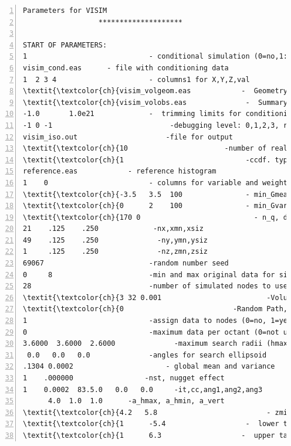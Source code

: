 \documentclass[12t]{article}
\begin{document}
\clearpage
\begin{table}
\scriptsize
\begin{Verbatim}[fontfamily=tt,numbers=left,commandchars=\\\{\}]
                  Parameters for VISIM
                  ********************

START OF PARAMETERS:
1                             - conditional simulation (0=no,1:(p,v), 2:(p), 3:(v)
visim_cond.eas      - file with conditioning data
1  2 3 4                      - columns1 for X,Y,Z,val
\textit{\textcolor{ch}{visim_volgeom.eas            -  Geometry of volume/ray}}
\textit{\textcolor{ch}{visim_volobs.eas              -  Summary of volgeom.eas.}}
-1.0       1.0e21             -  trimming limits for conditioning data
-1 0 -1                            -debugging level: 0,1,2,3, read\_covtab [1=from disk], read\_lambda
visim_iso.out                     -file for output
\textit{\textcolor{ch}{10                       -number of realizations to generate}}
\textit{\textcolor{ch}{1                             -ccdf. type: 0-Gaussian, 1-Dssim-histogram reproduction}}
reference.eas            - reference histogram
1    0                        - columns for variable and weights
\textit{\textcolor{ch}{-3.5   3.5  100               - min_Gmean, max_Gmean, n_Gmean}}
\textit{\textcolor{ch}{0      2    100               - min_Gvar, max_Gvar, n_Gvar}}
\textit{\textcolor{ch}{170 0                           - n_q, do\_discrete}}
21    .125    .250             -nx,xmn,xsiz
49    .125    .250              -ny,ymn,ysiz
1     .125    .250              -nz,zmn,zsiz
69067                         -random number seed
0     8                       -min and max original data for sim
28                            -number of simulated nodes to use
\textit{\textcolor{ch}{3 32 0.001                         -Volume Neighborhood, method[0,1,2] , nusevols, accept_frac}}
\textit{\textcolor{ch}{0                          -Random Path, [1] independent, [2] rays first, [3] preferential}}
1                             -assign data to nodes (0=no, 1=yes)
0                             -maximum data per octant (0=not used)
3.6000  3.6000  2.6000              -maximum search radii (hmax,hmin,vert)
 0.0   0.0   0.0              -angles for search ellipsoid
.1304 0.0002                      - global mean and variance
1    .000000                 -nst, nugget effect
1    0.0002  83.5.0   0.0   0.0     -it,cc,ang1,ang2,ang3
      4.0  1.0  1.0      -a_hmax, a_hmin, a_vert
\textit{\textcolor{ch}{4.2   5.8                          - zmin,zmax (tail extrapolation for target histogram)}}
\textit{\textcolor{ch}{1      -5.4                   -  lower tail option, parameter}}
\textit{\textcolor{ch}{1      6.3                   -  upper tail option, parameter}}
\end{Verbatim}
\caption{Input parameter file for \visimprog.}
\label{tab:par}
\end{table}
\end{document}

